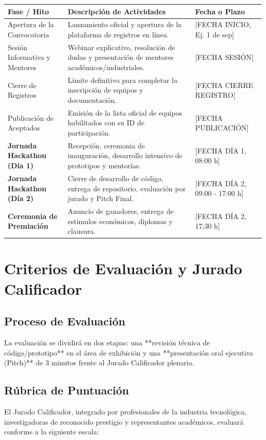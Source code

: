 \documentclass[11pt,letterpaper]{article}
\begin{document}
\begin{center}
\begin{longtable}{@{}p{4.0cm} p{7.5cm} p{3.5cm}@{}}
\toprule
\textbf{Fase / Hito} & \textbf{Descripción de Actividades} & \textbf{Fecha o Plazo} \\
\midrule
\endhead
Apertura de la Convocatoria & Lanzamiento oficial y apertura de la plataforma de registros en línea. & [FECHA INICIO, Ej. 1 de sep] \\
Sesión Informativa y Mentores & Webinar explicativo, resolución de dudas y presentación de mentores académicos/industriales. & [FECHA SESIÓN] \\
Cierre de Registros & Límite definitivo para completar la inscripción de equipos y documentación. & [FECHA CIERRE REGISTRO] \\
Publicación de Aceptados & Emisión de la lista oficial de equipos habilitados con su ID de participación. & [FECHA PUBLICACIÓN] \\
\midrule
\textbf{Jornada Hackathon (Día 1)} & Recepción, ceremonia de inauguración, desarrollo intensivo de prototipos y mentorías. & [FECHA DÍA 1, 08:00 h] \\
\textbf{Jornada Hackathon (Día 2)} & Cierre de desarrollo de código, entrega de repositorio, evaluación por jurado y Pitch Final. & [FECHA DÍA 2, 09:00 - 17:00 h] \\
\textbf{Ceremonia de Premiación} & Anuncio de ganadores, entrega de estímulos económicos, diplomas y clausura. & [FECHA DÍA 2, 17:30 h] \\
\bottomrule
\end{longtable}
\end{center}

\section{Criterios de Evaluación y Jurado Calificador}

\subsection{Proceso de Evaluación}
La evaluación se dividirá en dos etapas: una **revisión técnica de código/prototipo** en el área de exhibición y una **presentación oral ejecutiva (Pitch)** de 3 minutos frente al Jurado Calificador plenaria.

\subsection{Rúbrica de Puntuación}
El Jurado Calificador, integrado por profesionales de la industria tecnológica, investigadoras de reconocido prestigio y representantes académicos, evaluará conforme a la siguiente escala:
\end{document}

